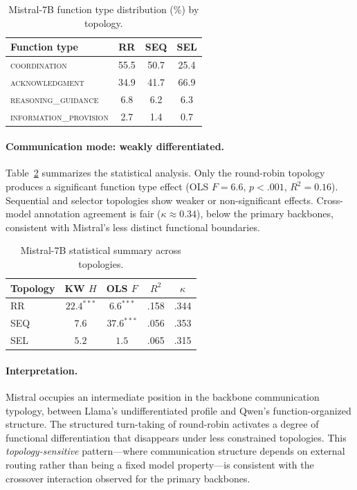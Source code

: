 \begin{table}[htbp]
\centering
\caption{Mistral-7B function type distribution (\%) by topology.}
\label{tab:mistral_dist}
\small
\begin{tabular}{lccc}
\toprule
\textbf{Function type} & \textbf{RR} & \textbf{SEQ} & \textbf{SEL} \\
\midrule
\textsc{coordination}          & 55.5 & 50.7 & 25.4 \\
\textsc{acknowledgment}        & 34.9 & 41.7 & 66.9 \\
\textsc{reasoning\_guidance}   & 6.8  & 6.2  & 6.3  \\
\textsc{information\_provision} & 2.7  & 1.4  & 0.7  \\
\bottomrule
\end{tabular}
\end{table}

\paragraph{Communication mode: weakly differentiated.} Table~\ref{tab:mistral_stats} summarizes the statistical analysis. Only the round-robin topology produces a significant function type effect (OLS $F = 6.6$, $p < .001$, $R^2 = 0.16$). Sequential and selector topologies show weaker or non-significant effects. Cross-model annotation agreement is fair ($\kappa \approx 0.34$), below the primary backbones, consistent with Mistral's less distinct functional boundaries.

\begin{table}[htbp]
\centering
\caption{Mistral-7B statistical summary across topologies.}
\label{tab:mistral_stats}
\small
\begin{tabular}{lcccc}
\toprule
\textbf{Topology} & \textbf{KW $H$} & \textbf{OLS $F$} & \textbf{$R^2$} & $\kappa$ \\
\midrule
RR  & $22.4^{***}$ & $6.6^{***}$ & .158 & .344 \\
SEQ & $7.6$        & $37.6^{***}$ & .056 & .353 \\
SEL & $5.2$        & $1.5$        & .065 & .315 \\
\bottomrule
\end{tabular}
\end{table}

\paragraph{Interpretation.} Mistral occupies an intermediate position in the backbone communication typology, between Llama's undifferentiated profile and Qwen's function-organized structure. The structured turn-taking of round-robin activates a degree of functional differentiation that disappears under less constrained topologies. This \emph{topology-sensitive} pattern---where communication structure depends on external routing rather than being a fixed model property---is consistent with the crossover interaction observed for the primary backbones.

